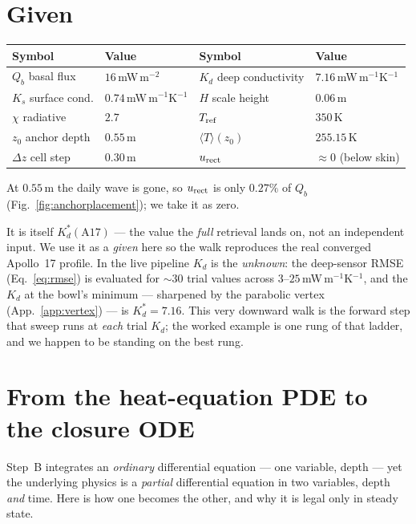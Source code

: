 \documentclass[11pt]{report}
\newcommand{\Tm}{\langle T\rangle}
\begin{document}
\section{Given}
\begin{center}\small
\begin{tabular}{@{}llll@{}}
\toprule
Symbol & Value & Symbol & Value \\
\midrule
$Q_b$ basal flux     & $16$\,mW\,m$^{-2}$ & $K_d$ deep conductivity & $7.16$\,mW\,m$^{-1}$K$^{-1}$ \\
$K_s$ surface cond.  & $0.74$\,mW\,m$^{-1}$K$^{-1}$ & $H$ scale height & $0.06$\,m \\
$\chi$ radiative     & $2.7$              & $T_{\rm ref}$           & $350$\,K \\
$z_0$ anchor depth   & $0.55$\,m          & $\Tm(z_0)$              & $255.15$\,K \\
$\Delta z$ cell step & $0.30$\,m          & $u_{\rm rect}$          & $\approx 0$ (below skin) \\
\bottomrule
\end{tabular}
\end{center}
\noindent At $0.55$\,m the daily wave is gone, so $u_{\rm rect}$ is only $0.27\%$ of
$Q_b$ (Fig.~\ref{fig:anchorplacement}); we take it as zero.

\begin{plain}[title={Where does $K_d=7.16$ come from?}]
It is itself $K_d^{*}(\mathrm{A17})$ --- the value the \emph{full} retrieval lands on,
not an independent input. We use it as a \emph{given} here so the walk reproduces the
real converged Apollo~17 profile. In the live pipeline $K_d$ is the \emph{unknown}: the
deep-sensor RMSE (Eq.~\ref{eq:rmse}) is evaluated for ${\sim}30$ trial values across
$3$--$25$\,mW\,m$^{-1}$K$^{-1}$, and the $K_d$ at the bowl's minimum --- sharpened by
the parabolic vertex (App.~\ref{app:vertex}) --- is $K_d^{*}=7.16$. This very downward
walk is the forward step that sweep runs at \emph{each} trial $K_d$; the worked example
is one rung of that ladder, and we happen to be standing on the best rung.
\end{plain}

\section{From the heat-equation PDE to the closure ODE}\label{app:pde2ode}

\begin{plain}
Step~B integrates an \emph{ordinary} differential equation --- one variable, depth ---
yet the underlying physics is a \emph{partial} differential equation in two variables,
depth \emph{and} time. Here is how one becomes the other, and why it is legal only in
steady state.
\end{plain}
\end{document}

